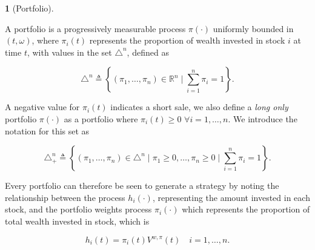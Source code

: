 \documentclass[british]{amsart} \usepackage{lmodern}
\numberwithin{equation}{section} \numberwithin{figure}{section}
\theoremstyle{plain} \newtheorem{thm}{\protect\theoremname}[section]
\theoremstyle{definition} \newtheorem{defn}[thm]{\protect\definitionname}
\theoremstyle{plain} \newtheorem{assumption}[thm]{\protect\assumptionname}
\theoremstyle{plain} \newtheorem{lem}[thm]{\protect\lemmaname}
\theoremstyle{plain} \newtheorem{prop}[thm]{\protect\propositionname}
\theoremstyle{remark} \newtheorem{rem}[thm]{\protect\remarkname}
\theoremstyle{plain} \newtheorem{cor}[thm]{\protect\corollaryname}
\newcommand{\defeq}{\mathop{\triangleq}} \newcommand{\almostsurely}{\text{a.s.}}
\newcommand{\rangei}{i=1,\dots,n} \newcommand{\measure}{\mathbb{P}}
\begin{document}
\begin{defn} [Portfolio]
  \label{def:portfolio}

  A portfolio is a progressively measurable process $\pi(\cdot)$ uniformly
  bounded in $(t,\omega)$, where $\pi_{i}(t)$ represents the proportion of wealth
  invested in stock $i$ at time $t$, with values in the set $\triangle^{n}$,
  defined as 

  \begin{equation*}
    \triangle^{n} \defeq 
    \left\{
          (\pi_{1}, \dots, \pi_{n}) \in \mathbb{R}^{n} 
          \mid
          \sum_{i=1}^{n} \pi_{i} = 1
    \right\}.
  \end{equation*}

  A negative value for $\pi_{i}(t)$ indicates a short sale, we also define a
  \textit{long only} portfolio $\pi(\cdot)$ as a portfolio where $\pi_{i}(t) \ge
  0$ $\forall \rangei$. We introduce the notation for this set as

  \begin{equation*}
    \triangle_{+}^{n} \defeq 
    \left\{
          (\pi_{1}, \dots, \pi_{n}) \in \triangle^{n} 
          \mid
          \pi_{1} \ge 0, \dots, \pi_{n} \ge 0
          \mid
          \sum_{i=1}^{n} \pi_{i} = 1
    \right\}.
  \end{equation*}

\end{defn}

Every portfolio can therefore be seen to generate a strategy by noting the
relationship between the process $h_{i}(\cdot)$, representing the amount
invested in each stock, and the portfolio weights process $\pi_{i}(\cdot)$ which
represents the proportion of total wealth invested in stock, which is 

\begin{equation}
  \label{eq:wealthinvestedbyportfolio}
  h_i(t) = \pi_{i}(t)V^{w,\pi}(t)
  \quad \rangei.
\end{equation}
\end{document}
